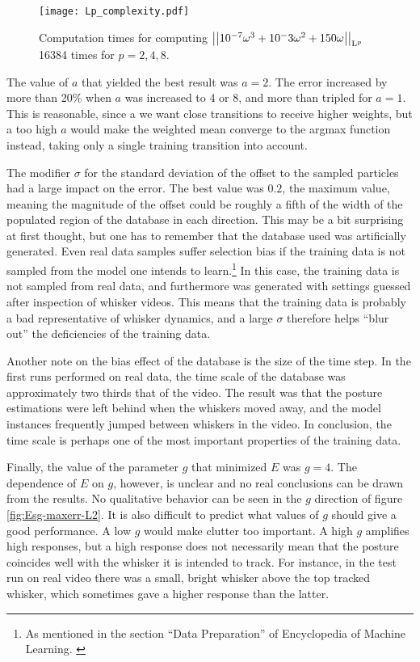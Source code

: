 \begin{figure}
  \centering
  \texttt{[image: Lp\_complexity.pdf]}
  \caption{Computation times for computing $\left\vert\left\vert10^{-7}\omega^3 +
      10^-3\omega^2 + 150\omega\right\vert\right\vert_{\mathrm{L}^{p}}$ 16384 times for $p=2,4,8$.}
  \label{fig:Lp-complexity}
\end{figure}

The value of $a$ that yielded the best result was $a=2$. The error
increased by more than 20\% when $a$ was increased to 4 or 8, and more
than tripled for $a=1$. This is reasonable, since a we want close
transitions to receive higher weights, but a too high $a$ would make
the weighted mean converge to the argmax function instead, taking only
a single training transition into account.

The modifier $\sigma$ for the standard deviation of the offset to the
sampled particles had a large impact on the error. The best value was
$0.2$, the maximum value, meaning the magnitude of the offset could be
roughly a fifth of the width of the populated region of the database
in each direction. This may be a bit surprising at first thought, but
one has to remember that the database used was artificially
generated. Even real data samples suffer selection bias if the
training data is not sampled from the model one intends to
learn.\footnote{As mentioned in the section ``Data Preparation'' of
  Encyclopedia of Machine
  Learning. \cite{EncyclopediaMachineLearning}} In this case, the
training data is not sampled from real data, and furthermore was
generated with settings guessed after inspection of whisker
videos. This means that the training data is probably a bad
representative of whisker dynamics, and a large $\sigma$ therefore
helps ``blur out'' the deficiencies of the training data.

Another note on the bias effect of the database is the size of the
time step. In the first runs performed on real data, the time scale of
the database was approximately two thirds that of the video. The
result was that the posture estimations were left behind when the
whiskers moved away, and the model instances frequently jumped between
whiskers in the video. In conclusion, the time scale is perhaps one of
the most important properties of the training data.

Finally, the value of the parameter $g$ that minimized $E$ was
$g=4$. The dependence of $E$ on $g$, however, is unclear and no real
conclusions can be drawn from the results. No qualitative behavior
can be seen in the $g$ direction of figure \ref{fig:Esg-maxerr-L2}. It
is also difficult to predict what values of $g$ should give a good
performance. A low $g$ would make clutter too important. A high $g$
amplifies high responses, but a high response does not necessarily
mean that the posture coincides well with the whisker it is intended
to track. For instance, in the test run on real video there was a
small, bright whisker above the top tracked whisker, which sometimes
gave a higher response than the latter.





